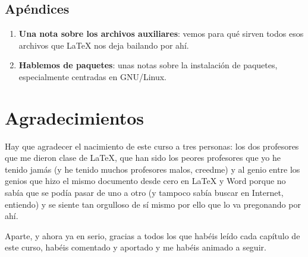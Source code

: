 \subsection*{Apéndices}

\begin{enumerate}
\item
  \textbf{Una nota sobre los archivos auxiliares}: vemos para qué sirven
  todos esos archivos que LaTeX nos deja bailando por ahí.
\item
  \textbf{Hablemos de paquetes}: unas notas sobre la instalación de
  paquetes, especialmente centradas en GNU/Linux.
\end{enumerate}

\section*{Agradecimientos}\label{sec:agradecimientos}

Hay que agradecer el nacimiento de este curso a tres personas: los dos
profesores que me dieron clase de LaTeX, que han sido los peores
profesores que yo he tenido jamás (y he tenido muchos profesores malos,
creedme) y al genio entre los genios que hizo el mismo documento desde
cero en LaTeX y Word porque no sabía que se podía pasar de uno a otro (y
tampoco sabía buscar en Internet, entiendo) y se siente tan orgulloso de
sí mismo por ello que lo va pregonando por ahí.

Aparte, y ahora ya en serio, gracias a todos los que habéis leído cada
capítulo de este curso, habéis comentado y aportado y me habéis animado
a seguir.
